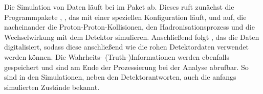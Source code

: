 Die Simulation von Daten läuft bei \lhcb im \gauss Paket \cite{gauss} ab. Dieses ruft zunächst die Programmpakete \evtgen \cite{evtgen}, \pythia \cite{pythia6,pythia8}, das mit einer speziellen \lhcb Konfiguration \cite{lhcbconf} läuft, und \geant \cite{geant1,geant2} auf, die nacheinander die Proton-Proton-Kollisionen, den Hadronisationsprozess und die Wechselwirkung mit dem Detektor simulieren. Anschließend folgt \boole \cite{boole}, das die Daten digitalisiert, sodass diese anschließend wie die rohen Detektordaten verwendet werden können. Die Wahrheits- (Truth-)Informationen werden ebenfalls gespeichert und sind am Ende der Prozessierung bei der Analyse abrufbar. So sind in den Simulationen, neben den Detektorantworten, auch die anfangs simulierten Zustände bekannt.  
